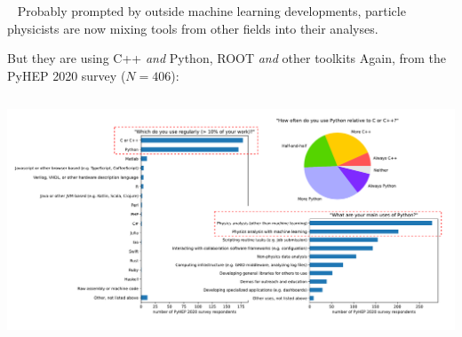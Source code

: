 \documentclass[aspectratio=169]{beamer}
\begin{document}
\begin{frame}{\mbox{ }}
\Large
Probably prompted by outside machine learning developments, particle physicists are now mixing tools from other fields into their analyses.
\end{frame}

\begin{frame}{But they are using C++ {\it and} Python, ROOT {\it and} other toolkits}
\vspace{0.25 cm}
Again, from the PyHEP 2020 survey ($N = 406$):

\begin{columns}
\includegraphics[width=\linewidth]{PLOTS/pyhep2020-survey-5.pdf}
\end{columns}
\end{frame}
\end{document}
